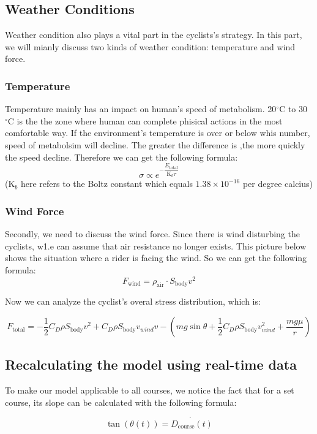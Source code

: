 \documentclass{article}
\begin{document}
		\subsection{Weather Conditions}
			Weather condition also plays a vital part in the cyclists's strategy. In this part, we will mianly discuss two kinds of weather condition: temperature and wind force.
		\subsubsection{Temperature}
			Temperature mainly has an impact on human's speed of metabolism. 20$^\circ \mathrm{C}$ to 30$^\circ\mathrm{C}$ is the the zone where human can complete phisical actions in the most comfortable way. If the environment's temperature is over or below whis number, speed of metabolsim will decline. The greater the difference is ,the more quickly the speed decline. Therefore we can get the following formula:
			$$\sigma\propto e^{-\dfrac{ E _\mathrm{total}}{\mathrm{K}_ b \tau}}$$
			($\mathrm{K}_ b $ here refers to the Boltz constant which equals $1.38\times10^{-16}$ per degree calcius)
		\subsubsection{Wind Force}
			Secondly, we need to discuss the wind force. Since there is wind disturbing the cyclists, w1.e can assume that air resistance no longer exists. This picture below shows the situation where a rider is facing the wind. So we can get the following formula:
			$$F_\mathrm{wind}=\rho_\mathrm{air}\cdot S_\mathrm{body}v^2$$

			Now we can analyze the cyclist's overal stress distribution, which is:

			\[F_\mathrm{total}=-\dfrac{1}{2}C_ D \rho S_\mathrm{body} v^2+C_ D \rho S_\mathrm{body}v_{wind}v-(mg\sin\theta+\dfrac{1}{2}C_ D \rho S_\mathrm{body}v_{wind}^2+\dfrac{mg\mu}{r})\]



		\subsection{Recalculating the model using real-time data}

			To make our model applicable to all courses, we notice the fact that for a set course, its slope can be calculated with the following formula:

			\[ \tan (\theta\left(t\right)) =\dot{D_{\mathrm{course}}\left( t \right) } \]
\end{document}
